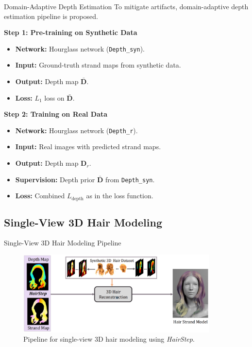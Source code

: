 \begin{frame}[t]{Domain-Adaptive Depth Estimation}
    To mitigate artifacts, domain-adaptive depth estimation pipeline is proposed.

    \vspace{5pt}

    \textbf{Step 1: Pre-training on Synthetic Data}
    \begin{itemize}
        \item \textbf{Network:} Hourglass network (\texttt{Depth\_syn}).
        \item \textbf{Input:} Ground-truth strand maps from synthetic data.
        \item \textbf{Output:} Depth map $\bar{\mathbf{D}}$.
        \item \textbf{Loss:} $L_1$ loss on $\bar{\mathbf{D}}$.
    \end{itemize}

    \vspace{5pt}

    \textbf{Step 2: Training on Real Data}
    \begin{itemize}
        \item \textbf{Network:} Hourglass network (\texttt{Depth\_r}).
        \item \textbf{Input:} Real images with predicted strand maps.
        \item \textbf{Output:} Depth map $\mathbf{D}_r$.
        \item \textbf{Supervision:} Depth prior $\bar{\mathbf{D}}$ from \texttt{Depth\_syn}.
        \item \textbf{Loss:} Combined $L_{\text{depth}}$ as in the loss function.
    \end{itemize}
\end{frame}

\subsection{Single-View 3D Hair Modeling}

\begin{frame}{Single-View 3D Hair Modeling Pipeline}
    \begin{figure}[h]
        \centering
        \includegraphics[width=0.9\textwidth]{assets/figures/method/reconstruction.png}
        \caption{Pipeline for single-view 3D hair modeling using \emph{HairStep}.}
        \label{fig:single_view_3d_hair_modeling}
    \end{figure}
\end{frame}

